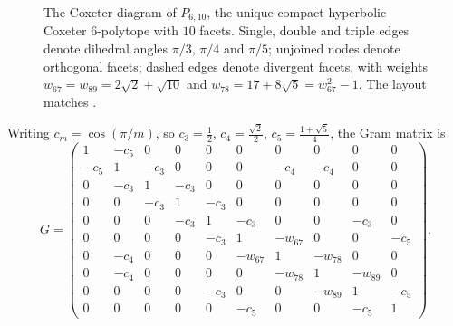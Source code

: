 \documentclass[11pt,reqno]{amsart}
\theoremstyle{plain}
\theoremstyle{definition}
\newcommand{\Gr}{G}
\newcommand{\PP}{P_{6,10}}
\newcommand{\esingle}[2]{\draw[line width=.5pt] (#1)--(#2);}
\newcommand{\edouble}[2]{%
  \draw[line width=1.9pt] (#1)--(#2);%
  \draw[line width=0.8pt,white] (#1)--(#2);}
\newcommand{\etriple}[2]{%
  \draw[line width=2.9pt] (#1)--(#2);%
  \draw[line width=1.9pt,white] (#1)--(#2);%
  \draw[line width=1.0pt] (#1)--(#2);%
  \draw[line width=0.35pt,white] (#1)--(#2);}
\newcommand{\edash}[2]{\draw[line width=.5pt,dashed] (#1)--(#2);}
\begin{document}
\begin{figure}[t]
\centering
{}
\caption{The Coxeter diagram of $\PP$, the unique compact hyperbolic Coxeter
$6$-polytope with $10$ facets. Single, double and triple edges denote dihedral
angles $\pi/3$, $\pi/4$ and $\pi/5$; unjoined nodes denote orthogonal facets;
dashed edges denote divergent facets, with weights
$w_{67}=w_{89}=2\sqrt2+\sqrt{10}$ and $w_{78}=17+8\sqrt5=w_{67}^2-1$. The
layout matches \cite[Fig.~5]{Burcroff2024}.}
\label{fig:diagram}
\end{figure}

Writing $c_m=\cos(\pi/m)$, so $c_3=\tfrac12$, $c_4=\tfrac{\sqrt2}{2}$,
$c_5=\tfrac{1+\sqrt5}{4}$, the Gram matrix is
\begin{equation}
\label{eq:gram}
\Gr=
\begin{pmatrix}
1 & -c_5 & 0 & 0 & 0 & 0 & 0 & 0 & 0 & 0\\
-c_5 & 1 & -c_3 & 0 & 0 & 0 & -c_4 & -c_4 & 0 & 0\\
0 & -c_3 & 1 & -c_3 & 0 & 0 & 0 & 0 & 0 & 0\\
0 & 0 & -c_3 & 1 & -c_3 & 0 & 0 & 0 & 0 & 0\\
0 & 0 & 0 & -c_3 & 1 & -c_3 & 0 & 0 & -c_3 & 0\\
0 & 0 & 0 & 0 & -c_3 & 1 & -w_{67} & 0 & 0 & -c_5\\
0 & -c_4 & 0 & 0 & 0 & -w_{67} & 1 & -w_{78} & 0 & 0\\
0 & -c_4 & 0 & 0 & 0 & 0 & -w_{78} & 1 & -w_{89} & 0\\
0 & 0 & 0 & 0 & -c_3 & 0 & 0 & -w_{89} & 1 & -c_5\\
0 & 0 & 0 & 0 & 0 & -c_5 & 0 & 0 & -c_5 & 1
\end{pmatrix}.
\end{equation}
\end{document}
